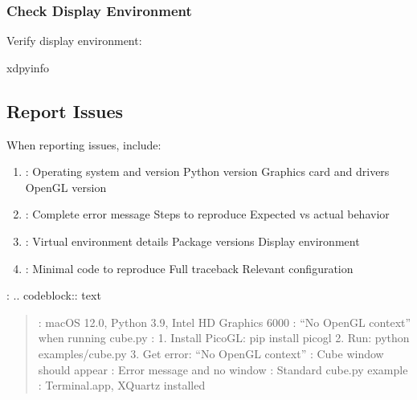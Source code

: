 \documentclass[a4paper,10pt,english,openany,oneside]{sphinxmanual}
\begin{document}
\subsubsection{Check Display Environment}
\label{\detokenize{troubleshooting:check-display-environment}}
\sphinxAtStartPar
Verify display environment:

\begin{sphinxVerbatim}[commandchars=\\\{\}]

xdpyinfo

\end{sphinxVerbatim}


\subsection{Report Issues}
\label{\detokenize{troubleshooting:report-issues}}
\sphinxAtStartPar
When reporting issues, include:
\begin{enumerate}
%
\item {} 
\sphinxAtStartPar
{}:
\sphinxhyphen{} Operating system and version
\sphinxhyphen{} Python version
\sphinxhyphen{} Graphics card and drivers
\sphinxhyphen{} OpenGL version

\item {} 
\sphinxAtStartPar
{}:
\sphinxhyphen{} Complete error message
\sphinxhyphen{} Steps to reproduce
\sphinxhyphen{} Expected vs actual behavior

\item {} 
\sphinxAtStartPar
{}:
\sphinxhyphen{} Virtual environment details
\sphinxhyphen{} Package versions
\sphinxhyphen{} Display environment

\item {} 
\sphinxAtStartPar
{}:
\sphinxhyphen{} Minimal code to reproduce
\sphinxhyphen{} Full traceback
\sphinxhyphen{} Relevant configuration

\end{enumerate}

\sphinxAtStartPar
{}:
.. code\sphinxhyphen{}block:: text
\begin{quote}

\sphinxAtStartPar
{}: macOS 12.0, Python 3.9, Intel HD Graphics 6000
: “No OpenGL context” when running cube.py
:
1. Install PicoGL: pip install picogl
2. Run: python examples/cube.py
3. Get error: “No OpenGL context”
: Cube window should appear
: Error message and no window
: Standard cube.py example
: Terminal.app, XQuartz installed
\end{quote}
\end{document}

